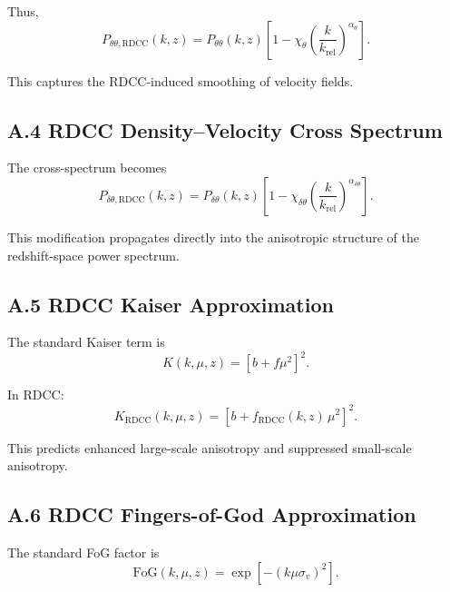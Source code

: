 \documentclass[11pt,a4paper]{article}
\begin{document}
Thus,
\begin{equation}
P_{\theta\theta,\mathrm{RDCC}}(k,z)
=
P_{\theta\theta}(k,z)
\left[
1
-
\chi_{\theta}
\left(
\frac{k}{k_{\mathrm{rel}}}
\right)^{\alpha_{\theta}}
\right].
\end{equation}

This captures the RDCC-induced smoothing of velocity fields.

\subsection*{A.4 RDCC Density–Velocity Cross Spectrum}

The cross-spectrum becomes
\begin{equation}
P_{\delta\theta,\mathrm{RDCC}}(k,z)
=
P_{\delta\theta}(k,z)
\left[
1
-
\chi_{\delta\theta}
\left(
\frac{k}{k_{\mathrm{rel}}}
\right)^{\alpha_{\delta\theta}}
\right].
\end{equation}

This modification propagates directly into the anisotropic structure of the redshift-space
power spectrum.

\subsection*{A.5 RDCC Kaiser Approximation}

The standard Kaiser term is
\begin{equation}
K(k,\mu,z)
=
\left[
b + f\mu^{2}
\right]^{2}.
\end{equation}

In RDCC:
\begin{equation}
K_{\mathrm{RDCC}}(k,\mu,z)
=
\left[
b + f_{\mathrm{RDCC}}(k,z)\,\mu^{2}
\right]^{2}.
\end{equation}

This predicts enhanced large-scale anisotropy and suppressed small-scale anisotropy.

\subsection*{A.6 RDCC Fingers-of-God Approximation}

The standard FoG factor is
\begin{equation}
\mathrm{FoG}(k,\mu,z)
=
\exp\!\left[
- (k\mu\sigma_{v})^{2}
\right].
\end{equation}
\end{document}
